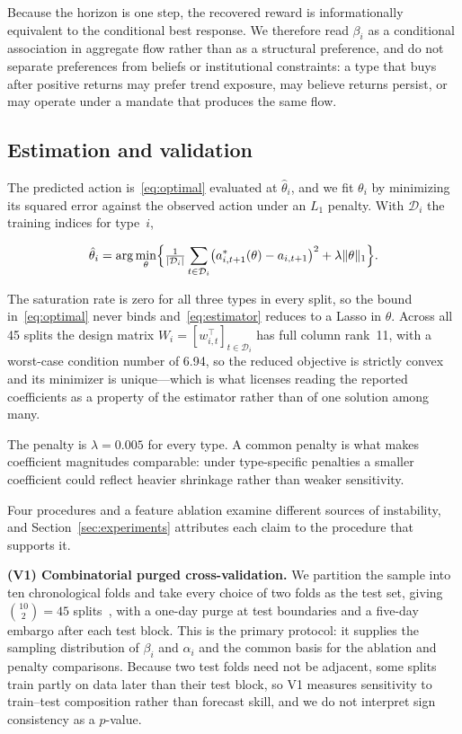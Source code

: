 Because the horizon is one step, the recovered reward is informationally
equivalent to the conditional best response. We therefore read $\beta_i$
as a conditional association in aggregate flow rather than as a
structural preference, and do not separate preferences from beliefs or
institutional constraints: a type that buys after positive returns may
prefer trend exposure, may believe returns persist, or may operate under
a mandate that produces the same flow.

\subsection{Estimation and validation}
\label{sec:method-estimation}

The predicted action is~\eqref{eq:optimal} evaluated at $\hat\theta_i$,
and we fit $\theta_i$ by minimizing its squared error against the
observed action under an $L_1$ penalty. With $\mathcal{D}_i$ the training
indices for type~$i$,

\begin{equation}
  \label{eq:estimator}
  \hat\theta_i = \arg\min_{\theta}
  \Bigl\{ \tfrac{1}{|\mathcal{D}_i|}
    \sum_{t \in \mathcal{D}_i}
      \bigl( a^{*}_{i,t+1}(\theta) - a_{i,t+1} \bigr)^2
    + \lambda \lVert \theta \rVert_1 \Bigr\}.
\end{equation}

The saturation rate is zero for all three types in every split, so the
bound in~\eqref{eq:optimal} never binds and~\eqref{eq:estimator} reduces
to a Lasso in $\theta$. Across all 45 splits the design matrix
$W_i = [w_{i,t}^{\top}]_{t \in \mathcal{D}_i}$ has full column rank~11,
with a worst-case condition number of 6.94, so the reduced objective is
strictly convex and its minimizer is unique---which is what licenses
reading the reported coefficients as a property of the estimator rather
than of one solution among many.

The penalty is $\lambda = 0.005$ for every type. A common penalty is what
makes coefficient magnitudes comparable: under type-specific penalties a
smaller coefficient could reflect heavier shrinkage rather than weaker
sensitivity.

Four procedures and a feature ablation examine different sources of
instability, and Section~\ref{sec:experiments} attributes each claim to
the procedure that supports it.

\textbf{(V1) Combinatorial purged cross-validation.} We partition the
sample into ten chronological folds and take every choice of two folds as
the test set, giving $\binom{10}{2} = 45$
splits~\cite{lopezdeprado2018}, with a one-day purge at test boundaries
and a five-day embargo after each test block. This is the primary
protocol: it supplies the sampling distribution of $\beta_i$ and
$\alpha_i$ and the common basis for the ablation and penalty comparisons.
Because two test folds need not be adjacent, some splits train partly on
data later than their test block, so V1 measures sensitivity to
train--test composition rather than forecast skill, and we do not
interpret sign consistency as a $p$-value.


